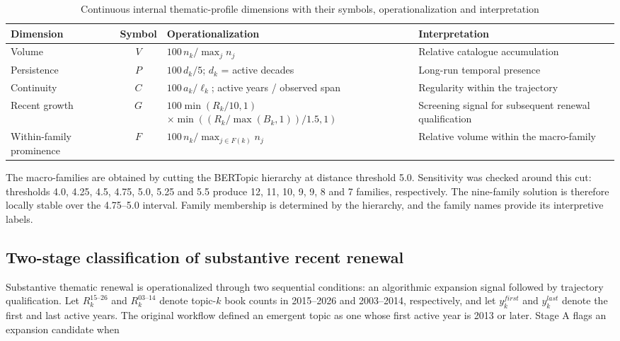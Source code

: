 \documentclass[futureinternet,article,submit,moreauthors]{Definitions/mdpi}
\begin{document}
\begin{table}[htbp]
\caption{Continuous internal thematic-profile dimensions with their symbols, operationalization and interpretation}\label{tab:internaldims}
\footnotesize
\setlength{\tabcolsep}{3.5pt}
\begin{tabularx}{\textwidth}{@{}p{}c p{}Y@{}}
\toprule
Dimension & Symbol & Operationalization & Interpretation \\
\midrule
Volume & $V$ & $100\,n_k/\max_j n_j$ & Relative catalogue accumulation \\
Persistence & $P$ & $100\,d_k/5$; $d_k$ = active decades & Long-run temporal presence \\
Continuity & $C$ & $100\,a_k/\ell_k$; active years / observed span & Regularity within the trajectory \\
Recent growth & $G$ &  & Screening signal for subsequent renewal qualification \\
Within-family prominence & $F$ & $100\,n_k/\max_{j\in F(k)}n_j$ & Relative volume within the macro-family \\
\bottomrule
\end{tabularx}
\end{table}

The macro-families are obtained by cutting the BERTopic hierarchy at distance threshold 5.0. Sensitivity was checked around this cut: thresholds 4.0, 4.25, 4.5, 4.75, 5.0, 5.25 and 5.5 produce 12, 11, 10, 9, 9, 8 and 7 families, respectively. The nine-family solution is therefore locally stable over the 4.75--5.0 interval. Family membership is determined by the hierarchy, and the family names provide its interpretive labels.

\subsection{Two-stage classification of substantive recent renewal}\label{subsec:renewalmethod}

Substantive thematic renewal is operationalized through two sequential conditions: an algorithmic expansion signal followed by trajectory qualification. Let $R^{15\text{--}26}_k$ and $R^{03\text{--}14}_k$ denote topic-$k$ book counts in 2015--2026 and 2003--2014, respectively, and let $y^{first}_k$ and $y^{last}_k$ denote the first and last active years. The original workflow defined an emergent topic as one whose first active year is 2013 or later. Stage A flags an expansion candidate when
\end{document}

